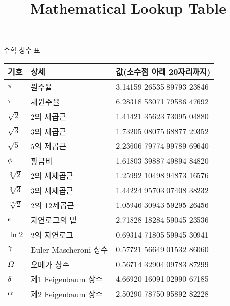 \documentclass[10pt, a4paper]{article}
\title{Mathematical Lookup Table}
\author{}
\begin{document}
\begin{center}
    \huge{수학 상수 표}\normalsize\\
    \begin{longtable}{l | l l}
        기호 & 상세 & 값(소수점 아래 20자리까지)\\
        \hline\hline
        \(\pi\)                         & 원주율                                & 3.14159 26535 89793 23846\\
        \(\tau\)                        & 새원주율                              & 6.28318 53071 79586 47692\\
        \(\sqrt{2}\)                    & 2의 제곱근                            & 1.41421 35623 73095 04880\\
        \(\sqrt{3}\)                    & 3의 제곱근                            & 1.73205 08075 68877 29352\\
        \(\sqrt{5}\)                    & 5의 제곱근                            & 2.23606 79774 99789 69640\\
        \hline
        \(\phi\)                        & 황금비                                & 1.61803 39887 49894 84820\\
        \(\sqrt[3]{2}\)                 & 2의 세제곱근                          & 1.25992 10498 94873 16576\\
        \(\sqrt[3]{3}\)                 & 3의 세제곱근                          & 1.44224 95703 07408 38232\\
        \(\sqrt[12]{2}\)                & 2의 12제곱근                          & 1.05946 30943 59295 26456\\
        \(e\)                           & 자연로그의 밑                         & 2.71828 18284 59045 23536\\
        \hline
        \(\ln{2}\)                      & 2의 자연로그                          & 0.69314 71805 59945 30941\\
        \(\gamma\)                      & Euler-Mascheroni 상수                 & 0.57721 56649 01532 86060\\
        \(\Omega\)                      & 오메가 상수                           & 0.56714 32904 09783 87299\\
        \(\delta\)                      & 제1 Feigenbaum 상수                   & 4.66920 16091 02990 67185\\
        \(\alpha\)                      & 제2 Feigenbaum 상수                   & 2.50290 78750 95892 82228\\

\end{longtable}
\end{center}
\end{document}
